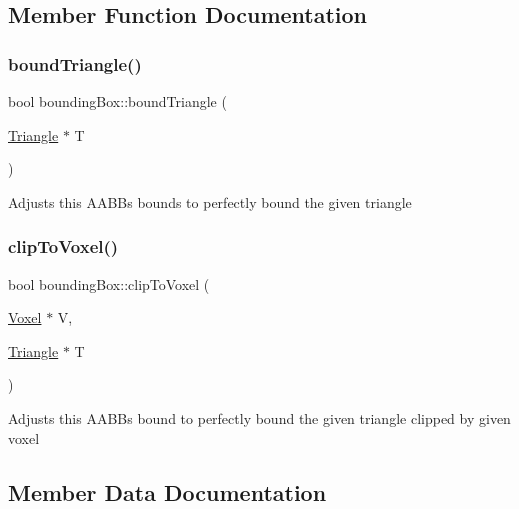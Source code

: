\subsection{Member Function Documentation}
\mbox{\label{classbounding_box_aa3b09cbb86a114fcbb3dba13a543efd6}} 
\subsubsection{\texorpdfstring{bound\+Triangle()}{boundTriangle()}}
{\footnotesize\ttfamily bool bounding\+Box\+::bound\+Triangle (\begin{DoxyParamCaption}\item[{\hyperlink{class_triangle}{Triangle} $\ast$}]{T }\end{DoxyParamCaption})\hspace{0.3cm}{\ttfamily [inline]}}

Adjusts this A\+A\+BB\textquotesingle{}s bounds to perfectly bound the given triangle \mbox{\label{classbounding_box_ac37969db26fdc180d7ce2cf90cb1368a}} 
\subsubsection{\texorpdfstring{clip\+To\+Voxel()}{clipToVoxel()}}
{\footnotesize\ttfamily bool bounding\+Box\+::clip\+To\+Voxel (\begin{DoxyParamCaption}\item[{\hyperlink{class_voxel}{Voxel} $\ast$}]{V,  }\item[{\hyperlink{class_triangle}{Triangle} $\ast$}]{T }\end{DoxyParamCaption})\hspace{0.3cm}{\ttfamily [inline]}}

Adjusts this A\+A\+BB\textquotesingle{}s bound to perfectly bound the given triangle clipped by given voxel 

\subsection{Member Data Documentation}
\mbox{\label{classbounding_box_a4a04c24133f0348d4f6ea460678a6a4f}} 
